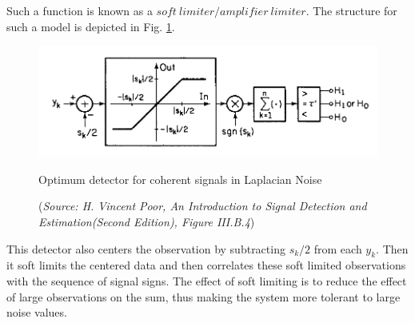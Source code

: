 \documentclass[a4paper,english,12pt]{article}
\begin{document}
\begin{exmp}
Such a function is known as a $soft\ limiter/amplifier\ limiter$. The structure for such a model is depicted in Fig. \ref{fig:Fig3}.
\begin{figure}[h]
\centering
\captionsetup{justification=centering}
\includegraphics[width=0.8\linewidth]{Figures/lec10Fig3}
\caption{Optimum detector for coherent signals in Laplacian Noise}
\caption*{\footnotesize(\textit{Source: H. Vincent Poor, An Introduction to Signal Detection and Estimation(Second Edition), Figure	 III.B.4})}
\label{fig:Fig3}
\end{figure}

This detector also centers the observation by subtracting $s_{k}/2$ from each $y_{k}$. Then it soft limits the centered data and then correlates these soft limited observations with the sequence of signal signs. The effect of soft limiting is to reduce the effect of large observations on the sum, thus making the system more tolerant to large noise values.
\end{exmp}
\end{document}
